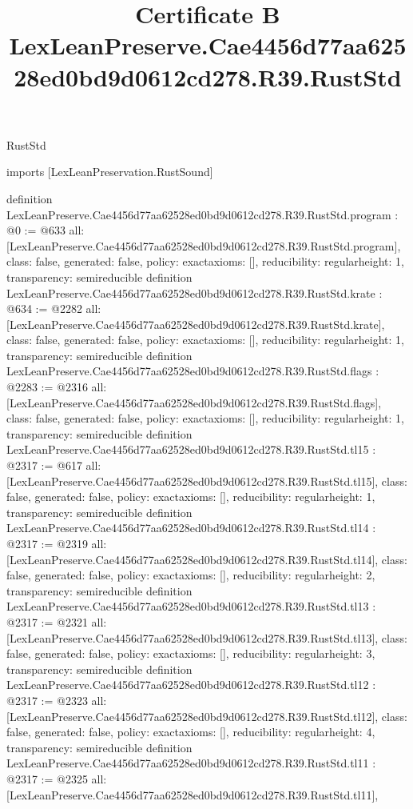 \begin{lexlean}{RustStd}
\title{Certificate B LexLeanPreserve.Cae4456d77aa62528ed0bd9d0612cd278.R39.RustStd}
\begin{coremodule}
imports [LexLeanPreservation.RustSound]

definition LexLeanPreserve.Cae4456d77aa62528ed0bd9d0612cd278.R39.RustStd.program : @0 := @633 {
  all: [LexLeanPreserve.Cae4456d77aa62528ed0bd9d0612cd278.R39.RustStd.program],
  class: false,
  generated: false,
  policy: exact{axioms: []},
  reducibility: regular{height: 1},
  transparency: semireducible
}
definition LexLeanPreserve.Cae4456d77aa62528ed0bd9d0612cd278.R39.RustStd.krate : @634 := @2282 {
  all: [LexLeanPreserve.Cae4456d77aa62528ed0bd9d0612cd278.R39.RustStd.krate],
  class: false,
  generated: false,
  policy: exact{axioms: []},
  reducibility: regular{height: 1},
  transparency: semireducible
}
definition LexLeanPreserve.Cae4456d77aa62528ed0bd9d0612cd278.R39.RustStd.flags : @2283 := @2316 {
  all: [LexLeanPreserve.Cae4456d77aa62528ed0bd9d0612cd278.R39.RustStd.flags],
  class: false,
  generated: false,
  policy: exact{axioms: []},
  reducibility: regular{height: 1},
  transparency: semireducible
}
definition LexLeanPreserve.Cae4456d77aa62528ed0bd9d0612cd278.R39.RustStd.tl15 : @2317 := @617 {
  all: [LexLeanPreserve.Cae4456d77aa62528ed0bd9d0612cd278.R39.RustStd.tl15],
  class: false,
  generated: false,
  policy: exact{axioms: []},
  reducibility: regular{height: 1},
  transparency: semireducible
}
definition LexLeanPreserve.Cae4456d77aa62528ed0bd9d0612cd278.R39.RustStd.tl14 : @2317 := @2319 {
  all: [LexLeanPreserve.Cae4456d77aa62528ed0bd9d0612cd278.R39.RustStd.tl14],
  class: false,
  generated: false,
  policy: exact{axioms: []},
  reducibility: regular{height: 2},
  transparency: semireducible
}
definition LexLeanPreserve.Cae4456d77aa62528ed0bd9d0612cd278.R39.RustStd.tl13 : @2317 := @2321 {
  all: [LexLeanPreserve.Cae4456d77aa62528ed0bd9d0612cd278.R39.RustStd.tl13],
  class: false,
  generated: false,
  policy: exact{axioms: []},
  reducibility: regular{height: 3},
  transparency: semireducible
}
definition LexLeanPreserve.Cae4456d77aa62528ed0bd9d0612cd278.R39.RustStd.tl12 : @2317 := @2323 {
  all: [LexLeanPreserve.Cae4456d77aa62528ed0bd9d0612cd278.R39.RustStd.tl12],
  class: false,
  generated: false,
  policy: exact{axioms: []},
  reducibility: regular{height: 4},
  transparency: semireducible
}
definition LexLeanPreserve.Cae4456d77aa62528ed0bd9d0612cd278.R39.RustStd.tl11 : @2317 := @2325 {
  all: [LexLeanPreserve.Cae4456d77aa62528ed0bd9d0612cd278.R39.RustStd.tl11],
}
\end{coremodule}
\end{lexlean}
